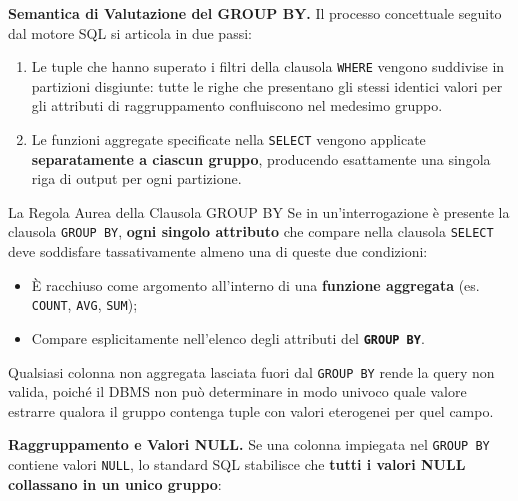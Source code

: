 \documentclass[12pt]{extarticle}
\begin{document}
\medskip
\noindent \textbf{Semantica di Valutazione del GROUP BY.} Il processo concettuale seguito dal motore SQL si articola in due passi:
\begin{enumerate}
    \item Le tuple che hanno superato i filtri della clausola \texttt{WHERE} vengono suddivise in partizioni disgiunte: tutte le righe che presentano gli stessi identici valori per gli attributi di raggruppamento confluiscono nel medesimo gruppo.
    \item Le funzioni aggregate specificate nella \texttt{SELECT} vengono applicate \textbf{separatamente a ciascun gruppo}, producendo esattamente una singola riga di output per ogni partizione.
\end{enumerate}

\begin{cbox}{La Regola Aurea della Clausola GROUP BY}
\noindent Se in un'interrogazione è presente la clausola \texttt{GROUP BY}, \textbf{ogni singolo attributo} che compare nella clausola \texttt{SELECT} deve soddisfare tassativamente almeno una di queste due condizioni:
\begin{itemize}
    \item È racchiuso come argomento all'interno di una \textbf{funzione aggregata} (es. \texttt{COUNT}, \texttt{AVG}, \texttt{SUM});
    \item Compare esplicitamente nell'elenco degli attributi del \textbf{\texttt{GROUP BY}}.
\end{itemize}
\medskip
\noindent Qualsiasi colonna non aggregata lasciata fuori dal \texttt{GROUP BY} rende la query non valida, poiché il DBMS non può determinare in modo univoco quale valore estrarre qualora il gruppo contenga tuple con valori eterogenei per quel campo.
\end{cbox}

\medskip
\noindent \textbf{Raggruppamento e Valori NULL.} Se una colonna impiegata nel \texttt{GROUP BY} contiene valori \texttt{NULL}, lo standard SQL stabilisce che \textbf{tutti i valori NULL collassano in un unico gruppo}:
\end{document}
